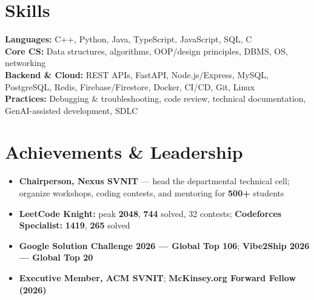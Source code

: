 \documentclass[a4paper,10pt]{article}
\begin{document}
\section{Skills}
\noindent\small
\textbf{Languages:} C++, Python, Java, TypeScript, JavaScript, SQL, C \\[0.6mm]
\textbf{Core CS:} Data structures, algorithms, OOP/design principles, DBMS, OS, networking \\[0.6mm]
\textbf{Backend \& Cloud:} REST APIs, FastAPI, Node.js/Express, MySQL, PostgreSQL, Redis, Firebase/Firestore, Docker, CI/CD, Git, Linux \\[0.6mm]
\textbf{Practices:} Debugging \& troubleshooting, code review, technical documentation, GenAI-assisted development, SDLC

\section{Achievements \& Leadership}
\begin{itemize}
  \item \textbf{Chairperson, Nexus SVNIT} --- head the departmental technical cell; organize workshops, coding contests, and mentoring for \textbf{500+} students
  \item \textbf{LeetCode Knight:} peak \textbf{2048}, \textbf{744} solved, 32 contests; \textbf{Codeforces Specialist:} \textbf{1419}, \textbf{265} solved
  \item \textbf{Google Solution Challenge 2026 --- Global Top 106}; \textbf{Vibe2Ship 2026 --- Global Top 20}
  \item \textbf{Executive Member, ACM SVNIT}; \textbf{McKinsey.org Forward Fellow (2026)}
\end{itemize}
\end{document}
